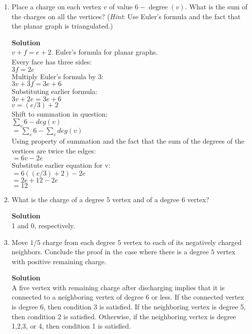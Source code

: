 \documentclass[11pt]{article}
\newenvironment{Parts}{\begin{enumerate}[label=(\alph*)]}{\end{enumerate}}
\newcommand*{\Part}{\item}
\begin{document}
\begin{Parts}
\Part Place a charge on each vertex $v$ of value $6-\operatorname{degree}(v)$. What is
the sum of the charges on all the vertices?
(\textit{Hint}: Use Euler's formula and the fact that the planar graph is
triangulated.)

\begin{mdframed} \textbf{Solution} \\
$v+f=e+2$. Euler's formula for planar graphs. \\
Every face has three sides: \\
$3f=2e$ \\
Multiply Euler's formula by 3: \\
$3v+3f=3e+6$\\
Substituting earlier formula: \\
$3v+2e=3e+6$ \\
$v=(e/3)+2$\\
Shift to summation in question: \\
$\sum_{v} 6-deg(v)$ \\
$=\sum_{v} 6 - \sum_{v} deg(v)$\\
Using property of summation and the fact that the sum of the degrees of the vertices are twice the edges: \\
$=6v-2e$ \\
Substitute earlier equation for v: \\
$=6((e/3)+2)-2e$ \\
$=2e+12-2e$ \\
$=12$ \\
\end{mdframed}

\Part What is the charge of a degree $5$ vertex and of a degree $6$ vertex?

\begin{mdframed} \textbf{Solution} \\
1 and 0, respectively.
\end{mdframed}

\pagebreak 

\Part Move $1/5$ charge from each degree $5$ vertex to each of its negatively charged 
neighbors. Conclude the proof in the case where there is a degree $5$
vertex with positive remaining charge. 

\begin{mdframed} \textbf{Solution} \\
A five vertex with remaining charge after discharging implies that it is connected to a neighboring vertex of degree 6 or less. If the connected vertex is degree 6, then condition 3 is satisfied. If the neighboring vertex is degree 5, then condition 2 is satisfied. Otherwise, if the neighboring vertex is degree 1,2,3, or 4, then condition 1 is satisfied.
\end{mdframed}


\end{Parts}
\end{document}
